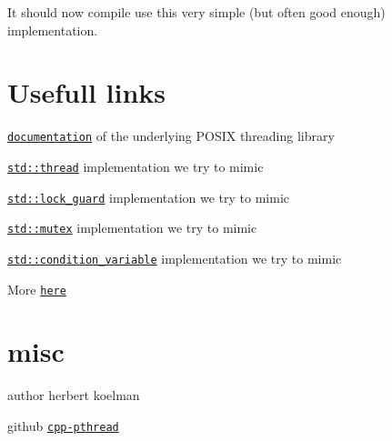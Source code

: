 It should now compile use this very simple (but often good enough) implementation.

\section*{Usefull links}


\begin{DoxyItemize}
\item \href{http://pubs.opengroup.org/onlinepubs/007908799/xsh/threads.html}{\tt documentation} of the underlying P\+O\+S\+IX threading library
\item \href{http://en.cppreference.com/w/cpp/thread/thread}{\tt std\+::thread} implementation we try to mimic
\item \href{http://en.cppreference.com/w/cpp/thread/lock_guard/lock_guard}{\tt std\+::lock\+\_\+guard} implementation we try to mimic
\item \href{http://en.cppreference.com/w/cpp/thread/mutex}{\tt std\+::mutex} implementation we try to mimic
\item \href{http://en.cppreference.com/w/cpp/thread/condition_variable}{\tt std\+::condition\+\_\+variable} implementation we try to mimic
\end{DoxyItemize}

More \href{https://github.com/HerbertKoelman/cpp-pthread/wiki}{\tt here}

\section*{misc}


\begin{DoxyItemize}
\item author herbert koelman
\item github \href{https://github.com/HerbertKoelman/cpp-pthread}{\tt cpp-\/pthread} 
\end{DoxyItemize}